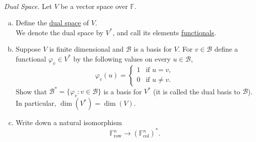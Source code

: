 \documentclass{article}
\begin{document}
\begin{problem} \\ 
   \textit{Dual Space.} Let $V$ be a vector space over $\mathbb{F}$.
   \begin{enumerate}[a)]
      \item Define the \underline{dual space} of $V$. \\ 
      We denote the dual space by $V^*$, and call its elements \underline{functionals}.
      \item Suppose $V$ is finite dimensional and $\mathscr{B}$ is a basis for $V$. For $v \in \mathscr{B}$ define a functional $\varphi_v \in V^*$ by the following values on every $u \in \mathscr{B}$,
      \[
         \varphi_v(u) = \begin{cases}
            1 & \text{if } u = v, \\
            0 & \text{if } u \neq v.
         \end{cases}
      \]
      Show that $\mathscr{B}^* = \{\varphi_v : v \in \mathscr{B}\}$ is a basis for $V^*$ (it is called the dual basis to $\mathscr{B}$). \\
      In particular, $\dim(V^*) = \dim(V)$.
      \item Write down a natural isomorphism
      \[
         \mathbb{F}^n_{\text{row}} \to (\mathbb{F}^n_{\text{col}})^*.
      \]
   \end{enumerate}
\end{problem}
\end{document}
